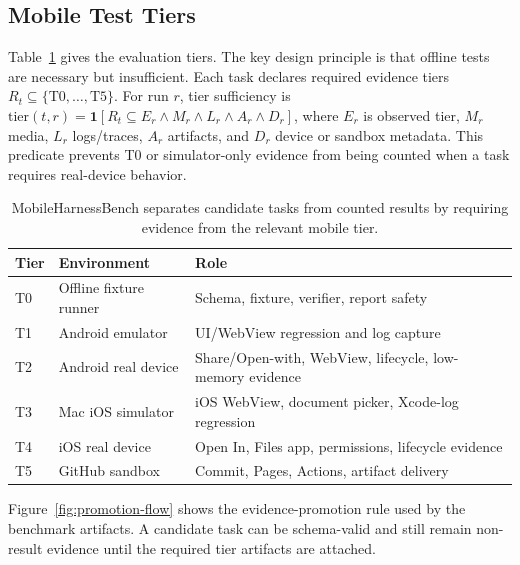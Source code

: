 \documentclass{article}
\begin{document}
\subsection{Mobile Test Tiers}

Table~\ref{tab:tiers} gives the evaluation tiers.
The key design principle is that offline tests are necessary but insufficient.
Each task declares required evidence tiers \(R_t\subseteq\{\mathrm{T0},\ldots,\mathrm{T5}\}\).
For run \(r\), tier sufficiency is \(\mathrm{tier}(t,r)=\mathbf{1}[R_t\subseteq E_r \land M_r \land L_r \land A_r \land D_r]\), where \(E_r\) is observed tier, \(M_r\) media, \(L_r\) logs/traces, \(A_r\) artifacts, and \(D_r\) device or sandbox metadata.
This predicate prevents T0 or simulator-only evidence from being counted when a task requires real-device behavior.

\begin{table}[t]
\centering
\small
\begin{tabular}{lll}
\toprule
Tier & Environment & Role \\
\midrule
T0 & Offline fixture runner & Schema, fixture, verifier, report safety \\
T1 & Android emulator & UI/WebView regression and log capture \\
T2 & Android real device & Share/Open-with, WebView, lifecycle, low-memory evidence \\
T3 & Mac iOS simulator & iOS WebView, document picker, Xcode-log regression \\
T4 & iOS real device & Open In, Files app, permissions, lifecycle evidence \\
T5 & GitHub sandbox & Commit, Pages, Actions, artifact delivery \\
\bottomrule
\end{tabular}
\caption{MobileHarnessBench separates candidate tasks from counted results by requiring evidence from the relevant mobile tier.}
\label{tab:tiers}
\end{table}

Figure~\ref{fig:promotion-flow} shows the evidence-promotion rule used by the benchmark artifacts.
A candidate task can be schema-valid and still remain non-result evidence until the required tier artifacts are attached.
\end{document}
